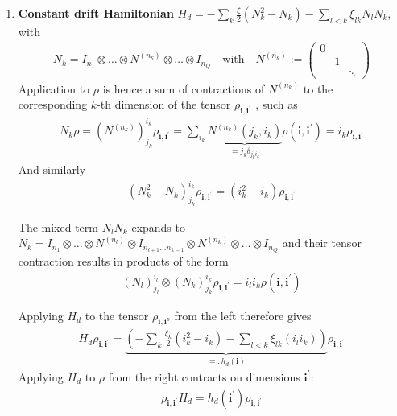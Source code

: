\documentclass[letterpaper]{article}
\newcommand{\bfi}{\boldsymbol{i}}
\newcommand{\p}{\prime}
\begin{document}
\begin{enumerate}
    \item \textbf{Constant drift Hamiltonian} $H_d = -\sum_k \frac{\xi}{2} \left(N_k^2 - N_k\right) - \sum_{l<k} \xi_{lk} N_lN_k$, with
      \begin{align}
      N_k = I_{n_1}\otimes \dots \otimes N^{(n_k)} \otimes \dots \otimes I_{n_Q} \quad \text{with} \quad N^{(n_k)} := \begin{pmatrix} 0 & & \\ & 1& \\ & & \ddots \end{pmatrix}
      \end{align}
      Application to $\rho$ is hence a sum of contractions of $N^{(n_k)}$ to the corresponding $k$-th dimension of the tensor $\rho_{\bfi, \bfi^\p}$ , such as
      \begin{align}
        N_k \rho = \left(N^{(n_k)}\right)_{j_k}^{i_k} \rho_{\bfi, \bfi^\p} = \sum_{i_k} \underbrace{N^{(n_k)}(j_k, i_k)}_{ = j_k\delta_{j_ki_k} } \rho(\bfi, \bfi^\p) = i_k \rho_{\bfi, \bfi^\p}
      \end{align}
      And similarly
      \begin{align}
        \left(N_k^2-N_k\right)_{j_k}^{i_k} \rho_{\bfi, \bfi^\p} = \left(i_k^2 - i_k\right) \rho_{\bfi,\bfi^\prime}
      \end{align}

      The mixed term $N_lN_k$ expands to $N_k = I_{n_1}\otimes \dots \otimes N^{(n_l)} \otimes I_{n_{l+1} \dots n_{k-1}}\otimes N^{(n_k)} \otimes \dots \otimes I_{n_Q}$ and their tensor contraction results in products of the form 
      \begin{align}
        (N_l)^{i_l}_{j_l} \otimes (N_k)_{j_k}^{i_k} \rho_{\bfi, \bfi^\p} = i_li_k\rho(\bfi, \bfi^\prime)
      \end{align}

      Applying $H_d$ to the tensor $\rho_{\bfi, \bfi^p}$ from the left therefore gives  
      \begin{align}
        H_d \rho_{\bfi, \bfi^\p} = \underbrace{\left(-\sum_k \frac{\xi_k}{2}(i_k^2 - i_k) - \sum_{l<k} \xi_{lk} (i_l i_k) \right)}_{=:h_d(\bfi)} \rho_{\bfi, \bfi^\p}
      \end{align}
      Applying $H_d$ to $\rho$ from the right contracts on dimensions $\bfi^\prime$:
      \begin{align}
        \rho_{\bfi, \bfi^\p} H_d  = h_d(\bfi^\p) \rho_{\bfi,\bfi^\p}
        \end{align}


\end{enumerate}
\end{document}

